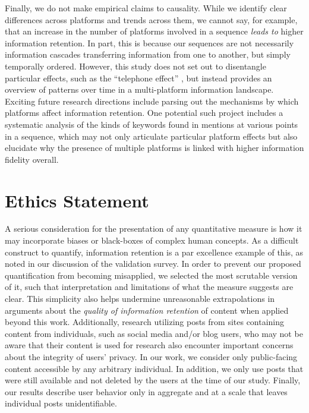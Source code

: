 \documentclass[letterpaper]{article} %
\begin{document}
Finally, we do not make empirical claims to causality. While we identify clear differences across platforms and trends across them, we cannot say, for example, that an increase in the number of platforms involved in a sequence \emph{leads to} higher information retention. In part, this is because our sequences are not necessarily information cascades transferring information from one to another, but simply temporally ordered. However, this study does not set out to disentangle particular effects, such as the ``telephone effect'' \citep{ribeiroMessageDistortionInformation2019}, but instead provides an overview of patterns over time in a multi-platform information landscape. Exciting future research directions include parsing out the mechanisms by which platforms affect information retention. One potential such project includes a systematic analysis of the kinds of keywords found in mentions at various points in a sequence, which may not only articulate particular platform effects but also elucidate why the presence of multiple platforms is linked with higher information fidelity overall.

\vspace{-1.07mm}
\section{Ethics Statement}
A serious consideration for the presentation of any quantitative measure is how it may incorporate biases or black-boxes of complex human concepts. As a difficult construct to quantify, information retention is a par excellence example of this, as noted in our discussion of the validation survey. In order to prevent our proposed quantification from becoming misapplied, we selected the most scrutable version of it, such that interpretation and limitations of what the measure suggests are clear. This simplicity also helps undermine unreasonable extrapolations in arguments about the \emph{quality of information retention} of content when applied beyond this work.
Additionally, research utilizing posts from sites containing content from individuals, such as social media and/or blog users, who may not be aware that their content is used for research also encounter important concerns about the integrity of users' privacy. In our work, we consider only public-facing content accessible by any arbitrary individual. In addition, we only use posts that were still available and not deleted by the users at the time of our study. Finally, our results describe user behavior only in aggregate and at a scale that leaves individual posts unidentifiable.
\end{document}
